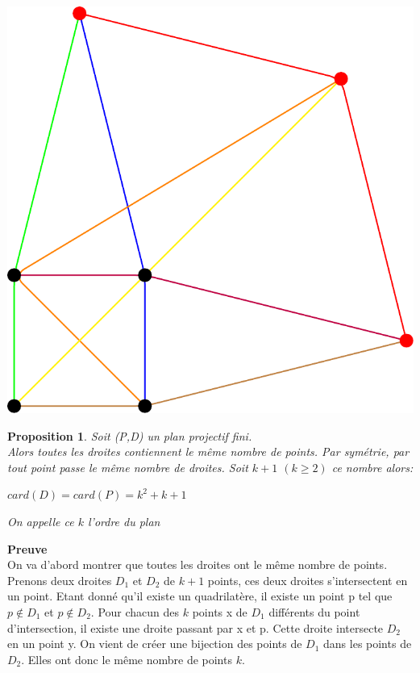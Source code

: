 \documentclass[a4paper]{article}
\newtheorem{Prop}[Def]{Proposition}
\begin{document}
\begin{center}
\includegraphics[scale=0.5]{test_tikz.pdf}
\end{center}
\vspace{2\baselineskip}
\begin{Prop}
Soit (P,D) un plan projectif fini.\\
Alors toutes les droites contiennent le même nombre de points. Par symétrie, par tout point passe le même nombre de droites. Soit $k+1$ $(k\geq2)$ ce nombre alors:
\begin{center}
$card(D)=card(P)=k^2+k+1$
\end{center}
On appelle ce $k$ l'ordre du plan
\end{Prop}
\textbf{Preuve}\\
On va d'abord montrer que toutes les droites ont le même nombre de points. Prenons deux droites $D_1$ et $D_2$ de $k+1$ points, ces deux droites s'intersectent en un point. Etant donné qu'il existe un quadrilatère, il existe un point p tel que $p \notin D_1$ et $p \notin D_2$. Pour chacun des $k$ points x de $D_1$ différents du point d'intersection, il existe une droite passant par x et p. Cette droite intersecte $D_2$ en un point y. On vient de créer une bijection des points de $D_1$ dans les points de $D_2$. Elles ont donc le même nombre de points $k$.\smallskip\\
\end{document}
